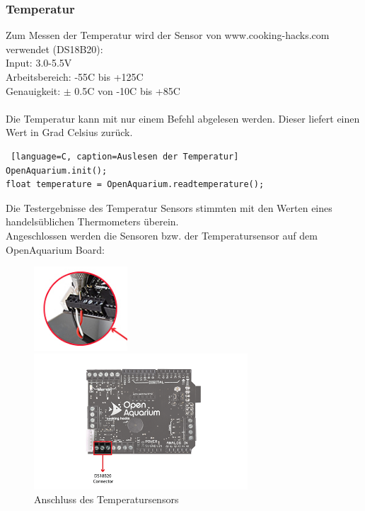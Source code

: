\subsubsection{Temperatur}
Zum Messen der Temperatur wird der Sensor von www.cooking-hacks.com verwendet (DS18B20): \\
Input: 3.0-5.5V  \\
Arbeitsbereich: -55\degree C bis +125\degree C  \\
Genauigkeit: $\pm$ 0.5\degree C von -10\degree C bis +85\degree C \cite{TempSensor} \\
\mbox{}\\
Die Temperatur kann mit nur einem Befehl abgelesen werden. Dieser liefert einen Wert in Grad Celsius zur\"uck.
\begin{lstlisting} [language=C, caption=Auslesen der Temperatur]
OpenAquarium.init();
float temperature = OpenAquarium.readtemperature();
\end{lstlisting}
Die Testergebnisse des Temperatur Sensors stimmten mit den Werten eines handelsüblichen Thermometers überein.  \mbox{} \\
Angeschlossen werden die Sensoren bzw. der Temperatursensor auf dem OpenAquarium Board: \\
\begin{figure}[ht]
	\captionsetup{justification=raggedright}  
	\begin{minipage}[b]{.4\textwidth}  
		\centering  
		\includegraphics[width=3.5cm]{images/temp_sensor_connection_detail}  
	\end{minipage}%
	\begin{minipage}[b]{0.6\textwidth}  
		\centering  
		\includegraphics[width=8cm]{images/temp_sensor_connection}  
	\end{minipage}
	\par
	\begin{minipage}[t]{.4\textwidth}
		\centering  
		\caption{Detaillierte Darstellung der Anordnung der Kabel vom Temperatursensor}  
	\end{minipage}%
	\begin{minipage}[t]{.6\textwidth}  
		\centering  
		\caption{Anschluss des Temperatursensors}  
	\end{minipage}  
\end{figure}

